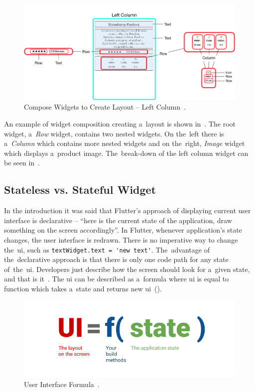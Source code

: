 \begin{figure}[htp]
    \centering
    \includegraphics[width=0.9\linewidth]{img/flutter/layout_compose_detail.png}
    \caption{Compose Widgets to Create Layout -- Left Column~\cite{flutter-widget-layout}.}
    \label{fig:flutter-compose-widget-detail}
\end{figure}

An example of widget composition creating a~layout is shown in~. The root widget, a~\textit{Row} widget, contains two nested widgets. On the~left there is a~\textit{Column} which contains more nested widgets and on the~right, \textit{Image} widget which displays a~product image. The~break-down of the left column widget can be seen in~. 


\subsection{Stateless vs. Stateful Widget}
In the introduction it was said that Flutter's approach of displaying current user interface is declarative -- ``here is the current state of the application, draw something on the screen accordingly''. In Flutter, whenever application's state changes, the user interface is redrawn. There is no imperative way to change the~\gls{ui}, such as \verb|textWidget.text = 'new text'|. The~advantage of the~declarative approach is that there is only one code path for any state of~the~\gls{ui}. Developers just describe how the screen should look for a~given state, and that is it~\cite{flutter-declarative}. The \gls{ui} can be described as a~formula where \gls{ui} is equal to function which takes a~state and returns new \gls{ui}~().

\begin{figure}[htp]
    \centering
    \includegraphics[width=0.6\linewidth]{img/flutter/ui_f_state.png}
    \caption{User Interface Formula~\cite{flutter-declarative}.}
    \label{fig:flutter-ui-formula}
\end{figure}
